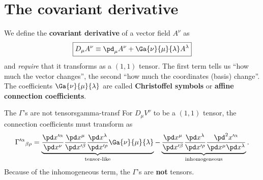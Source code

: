\section{The covariant derivative}

We define the \textbf{covariant derivative} of a vector field $A^\nu$ as
\begin{equation}
  \boxed{D_\mu A^\nu\equiv\pd_\mu A^\nu+\Ga{\nu}{\mu}{\lambda}A^\lambda}
  \label{eq:cov-der-vector}
\end{equation}
and \emph{require} that it transforms as a $(1,1)$ tensor. The first term tells us ``how much the vector changes'', the second ``how much the coordinates (basis) change''. The coefficients $\Ga{\nu}{\mu}{\lambda}$ are called \textbf{Christoffel symbols} or \textbf{affine connection coefficients}.

\begin{proposition}{The $\Gamma$'s are not tensors}{gamma-transf}
For $D_\mu V^\nu$ to be a $(1,1)$ tensor, the connection coefficients must transform as
\begin{equation}
  \Gamma'^{\alpha}{}_{\beta\rho}=
  \underbrace{\frac{\pd x'^\alpha}{\pd x^\nu}\frac{\pd x^\mu}{\pd x'^\beta}\frac{\pd x^\lambda}{\pd x'^\rho}\Ga{\nu}{\mu}{\lambda}}_{\text{tensor-like}}
  -\underbrace{\frac{\pd x^\mu}{\pd x'^\beta}\frac{\pd x^\lambda}{\pd x'^\rho}\frac{\pd^2x'^\alpha}{\pd x^\mu\pd x^\lambda}}_{\text{inhomogeneous}} .
  \label{eq:gamma-transf}
\end{equation}
Because of the inhomogeneous term, the $\Gamma$'s are \textbf{not} tensors.
\end{proposition}
